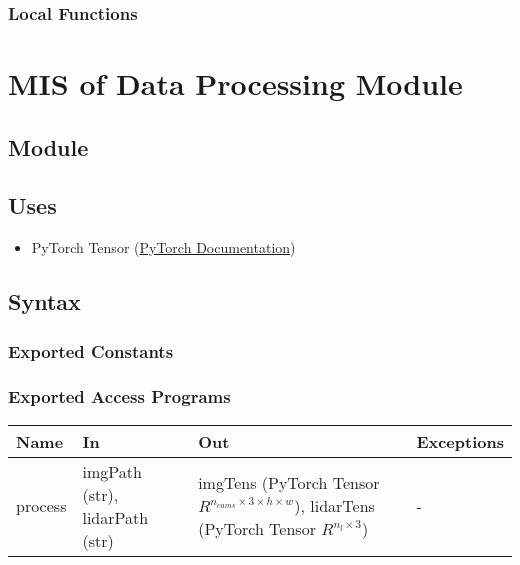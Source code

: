 \documentclass[12pt, titlepage]{article}
\begin{document}
\subsubsection{Local Functions}

\newpage

\section{MIS of Data Processing Module} \label{ModuleDataProc} 

\subsection{Module}



\subsection{Uses}
\begin{itemize}
  \item PyTorch Tensor (\href{https://pytorch.org/docs/stable/tensors.html}{PyTorch Documentation})
\end{itemize}

\subsection{Syntax}



\subsubsection{Exported Constants}



\subsubsection{Exported Access Programs}

\begin{center}
\begin{tabular}{p{2cm}|p{5cm}|p{3cm}|p{2cm}}
\hline
\textbf{Name} & \textbf{In} & \textbf{Out} & \textbf{Exceptions} \\
\hline
process & imgPath (str), lidarPath (str) & imgTens (PyTorch Tensor $R^{n_{cams}\times{}3\times{}h\times{}w}$), lidarTens (PyTorch Tensor $R^{n_{l}\times{}3}$) & - \\
\hline
\end{tabular}
\end{center}
\end{document}
